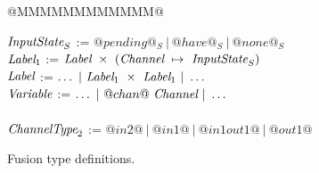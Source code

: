 
\begin{figure}

\begin{tabbing}
@MMMMMMMMMMMM@   \TABDEF \kill

$\textit{InputState}_S$ \> := \> $@pending@_S ~|~ @have@_S ~|~ @none@_S$
\\
$\textit{Label}_1$ \> := \> $\textit{Label}~\times~(\textit{Channel} ~\mapsto~ \textit{InputState}_S)$ \\
$\textit{Label}$   \> := \> $\ldots ~|~\textit{Label}_1~\times~\textit{Label}_1 ~|~ \ldots$ \\
$\textit{Variable}$     \> := \> $\ldots ~|~@chan@~\textit{Channel} ~|~ \ldots$ \\
\\

$\textit{ChannelType}_2$   \> := \> $@in2@~|~@in1@~|~@in1out1@~|~@out1@$
\end{tabbing}

\caption{Fusion type definitions.}
\label{fig:Fusion:Types}
\end{figure}


